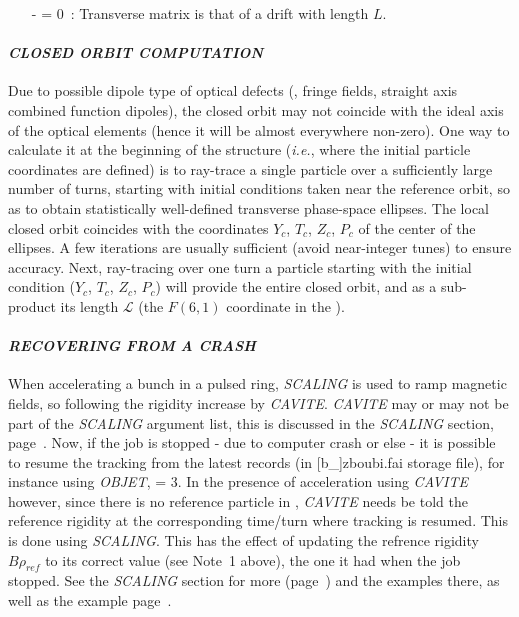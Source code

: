 {\begin{itemize}
\item[-]  = 0~: Transverse matrix is that of a drift with length $L$.
\end{itemize}


\bigskip

\paragraph{\textsl{CLOSED ORBIT COMPUTATION}}       

\medskip

\noindent Due to possible dipole type of optical defects (\eg, fringe fields, straight axis 
combined function dipoles), the closed orbit may not 
coincide with the ideal axis of the optical elements (hence it will be almost everywhere non-zero). One way to 
calculate it at the beginning of the structure (\emph{i.e.}, where the 
initial particle coordinates are defined) is to ray-trace 
a single particle over a sufficiently large number of turns, 
starting with   initial conditions  taken near the reference orbit, so as to 
obtain  statistically well-defined transverse phase-space ellipses. The 
local closed orbit  coincides with the 
coordinates $ Y_c $,  $ T_c $, $ Z_c $,  $ P_c $ of the center of the ellipses. 
A few iterations are usually sufficient (avoid near-integer tunes) to ensure accuracy.  Next, 
ray-tracing over one turn a particle starting with the initial condition 
($Y_c $, $ T_c $, $ Z_c$, $P_c$)  will provide the entire closed orbit, and as a sub-product its   length $\mathcal{L}$ 
(the $ F(6,1) $ coordinate in the \FORTRAN). 


\paragraph{\textsl{RECOVERING FROM A CRASH}} \label{CrashCAVITE}

\noindent When accelerating a bunch in a pulsed ring, \textsl{SCALING} is used to ramp magnetic fields, 
so following the rigidity increase by  \textsl{CAVITE}.  \textsl{CAVITE} may or may not be part of the \textsl{SCALING}
argument list, this is discussed in the \textsl{SCALING} section, page~\pageref{CrashSCALING}. 
Now, if the job is stopped - due to computer crash or else -  it is possible to resume the tracking 
from the latest records (in [b\_]zboubi.fai storage file), for instance using \textsl{OBJET}, \KOBJ = 3.
In the presence of acceleration using \textsl{CAVITE} however,  since there is no reference particle in \zgou, 
  \textsl{CAVITE}  needs be told the reference rigidity at the corresponding time/turn where tracking is resumed. 
This is done using \textsl{SCALING}. This has the effect of updating 
the refrence rigidity $B\rho_{ref}$ to its correct value (see Note~1 above), the one it had when the job stopped. 
See  the \textsl{SCALING} section for more (page~\pageref{SCALING}) and the examples there, as well as the example 
 page~\pageref{ExaOBJ3Recovery}. 


}
